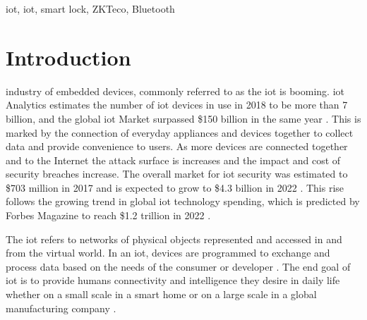 \documentclass[journal]{IEEEtran}
\begin{document}
\begin{IEEEkeywords}
\gls{iot}, \gls{iot}, smart lock, ZKTeco, Bluetooth
\end{IEEEkeywords}



%
\IEEEpeerreviewmaketitle



\section{Introduction}
% 
% 
% 
% 
 industry of embedded devices, commonly referred to as the \gls{iot} is booming. \gls{iot} Analytics estimates the number of \gls{iot} devices in use in 2018 to be more than 7 billion, and the global \gls{iot} Market surpassed \$150 billion in the same year \cite{Scully2017}. This is marked by the connection of everyday appliances and devices together to collect data and provide convenience to users. As more devices are connected together and to the Internet the attack surface is increases and the impact and cost of security breaches increase.  The overall market for \gls{iot} security was estimated to \$703 million in 2017 and is expected to grow to \$4.3 billion in 2022 \cite{Scully2017}. This rise follows the growing trend in global \gls{iot} technology spending, which is predicted by Forbes Magazine to reach \$1.2 trillion in 2022 \cite{Columbus2018}.

\bigskip

The \gls{iot} refers to networks of physical objects represented and accessed in and from the virtual world. In an \gls{iot}, devices are programmed to exchange and process data based on the needs of the consumer or developer \cite{Li2015}. The end goal of \gls{iot} is to provide humans connectivity and intelligence they desire in daily life whether on a small scale in a smart home or on a large scale in a global manufacturing company \cite{Li2015}. 
\end{document}

